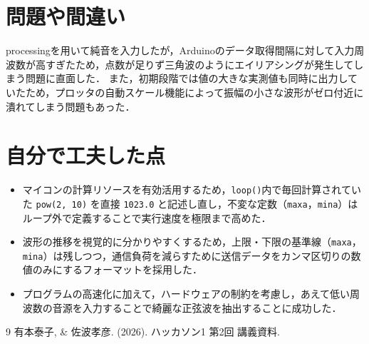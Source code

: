\documentclass[uplatex,dvipdfmx]{jlreq}
\begin{document}
\section{問題や間違い}
processingを用いて純音を入力したが，Arduinoのデータ取得間隔に対して入力周波数が高すぎたため，点数が足りず三角波のようにエイリアシングが発生してしまう問題に直面した．
また，初期段階では値の大きな実測値も同時に出力していたため，プロッタの自動スケール機能によって振幅の小さな波形がゼロ付近に潰れてしまう問題もあった．

\section{自分で工夫した点}
\begin{itemize}
    \item マイコンの計算リソースを有効活用するため，\texttt{loop()}内で毎回計算されていた \texttt{pow(2, 10)} を直接 \texttt{1023.0} と記述し直し，不変な定数（\texttt{maxa}，\texttt{mina}）はループ外で定義することで実行速度を極限まで高めた．
    \item 波形の推移を視覚的に分かりやすくするため，上限・下限の基準線（\texttt{maxa}，\texttt{mina}）は残しつつ，通信負荷を減らすために送信データをカンマ区切りの数値のみにするフォーマットを採用した．
    \item プログラムの高速化に加えて，ハードウェアの制約を考慮し，あえて低い周波数の音源を入力することで綺麗な正弦波を抽出することに成功した．
\end{itemize}

\begin{thebibliography}{9}
 有本泰子, \& 佐波孝彦. (2026). ハッカソン1 第2回 講義資料.
\end{thebibliography}
\end{document}
